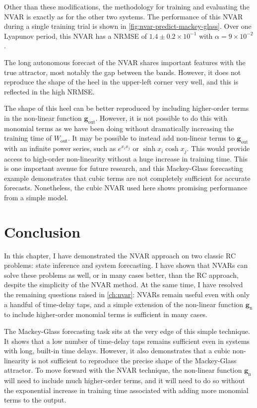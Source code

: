 Other than these modifications, the methodology for training and
evaluating the NVAR is exactly as for the other two systems. The
performance of this NVAR during a single training trial is shown in
\cref{fig:nvar-predict-mackey-glass}. Over one Lyapunov period, this
NVAR has a NRMSE of $1.4\pm0.2\times10^{-1}$ with $\alpha =
9\times10^{-2}$.

The long autonomous forecast of the NVAR shares important features
with the true attractor, most notably the gap between the
bands. However, it does not reproduce the shape of the heel in the
upper-left corner very well, and this is reflected in the high NRMSE.


The shape of this heel can be better reproduced by including
higher-order terms in the non-linear function
$\bm{g}_\text{out}$. However, it is not possible to do this with
monomial terms as we have been doing without dramatically increasing
the training time of $W_\text{out}$. It may be possible to instead add
non-linear terms to $\bm{g}_\text{out}$ with an infinite power series,
such as $e^{x_ix_j}$ or $\sinh{x_i}\cosh{x_j}$. This would provide
access to high-order non-linearity without a huge increase in training
time. This is one important avenue for future research, and this
Mackey-Glass forecasting example demonstrates that cubic terms are not
completely sufficient for accurate forecasts. Nonetheless, the cubic
NVAR used here shows promising performance from a simple model.


\section{Conclusion}

In this chapter, I have demonstrated the NVAR approach on two classic
RC problems: state inference and system forecasting. I have shown that
NVARs can solve these problems as well, or in many cases better, than
the RC approach, despite the simplicity of the NVAR method. At the
same time, I have resolved the remaining questions raised in
\cref{ch:nvar}: NVARs remain useful even with only a handful of
time-delay taps, and a simple extension of the non-linear function
$\bm{g}_\text{n}$ to include higher-order monomial terms is sufficient
in many cases.

The Mackey-Glass forecasting task sits at the very edge of this simple
technique. It shows that a low number of time-delay taps remains
sufficient even in systems with long, built-in time delays. However,
it also demonstrates that a cubic non-linearity is not sufficient to
reproduce the precise shape of the Mackey-Glass attractor. To move
forward with the NVAR technique, the non-linear function
$\bm{g}_\text{n}$ will need to include much higher-order terms, and it
will need to do so without the exponential increase in training time
associated with adding more monomial terms to the output.

